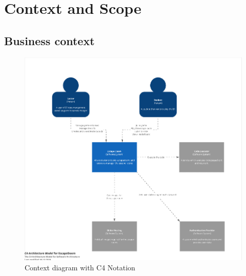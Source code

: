 \hypertarget{section-context-and-scope}{%
\section{Context and Scope}\label{section-context-and-scope}}

\hypertarget{_business_context}{%
\subsection{Business context}\label{_business_context}}
\begin{figure}
    \centering
    \includegraphics[width=1\linewidth]{C4-Layer1.png}
    \caption{Context diagram with C4 Notation}
    \label{fig:enter-label}
\end{figure}

\newpage